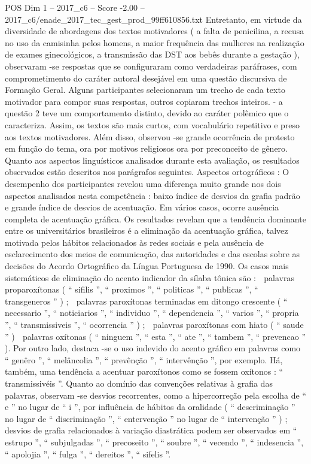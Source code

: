 \begin{textsample}{POS Dim 1 – 2017\_c6 – Score -2.00 – 2017\_c6/enade\_2017\_tec\_gest\_prod\_99ff610856.txt}
Entretanto, em virtude da diversidade de abordagens dos textos motivadores ( a falta de penicilina, a recusa no uso da camisinha pelos homens, a maior frequência das mulheres na realização de exames ginecológicos, a transmissão das DST aos bebês durante a gestação ), observaram -se respostas que se configuraram como verdadeiras paráfrases, com comprometimento do caráter autoral desejável em uma questão discursiva de Formação Geral.
Alguns participantes selecionaram um trecho de cada texto motivador para compor suas respostas, outros copiaram trechos inteiros. - a questão 2 teve um comportamento distinto, devido ao caráter polêmico que o caracteriza.
Assim, os textos são mais curtos, com vocabulário repetitivo e preso aos textos motivadores.
Além disso, observou -se grande ocorrência de protesto em função do tema, ora por motivos religiosos ora por preconceito de gênero.
Quanto aos aspectos linguísticos analisados durante esta avaliação, os resultados observados estão descritos nos parágrafos seguintes.
Aspectos ortográficos : O desempenho dos participantes revelou uma diferença muito grande nos dois aspectos analisados nesta competência : baixo índice de desvios da grafia padrão e grande índice de desvios de acentuação.
Em vários casos, ocorre ausência completa de acentuação gráfica.
Os resultados revelam que a tendência dominante entre os universitários brasileiros é a eliminação da acentuação gráfica, talvez motivada pelos hábitos relacionados às redes sociais e pela ausência de esclarecimento dos meios de comunicação, das autoridades e das escolas sobre as decisões do Acordo Ortográfico da Língua Portuguesa de 1990.
Os casos mais sistemáticos de eliminação do acento indicador da sílaba tônica são :  palavras proparoxítonas ( “ sifilis ”, “ proximos ”, “ politicas ”, “ publicas ”, “ transgeneros ” ) ;  palavras paroxítonas terminadas em ditongo crescente ( “ necessario ”, “ noticiarios ”, “ individuo ”, “ dependencia ”, “ varios ”, “ propria ”, “ transmissiveis ”, “ ocorrencia ” ) ;  palavras paroxítonas com hiato ( “ saude ” )  palavras oxítonas ( “ ninguem ”, “ esta ”, “ ate ”, “ tambem ”, “ prevencao ” ).
Por outro lado, destaca -se o uso indevido do acento gráfico em palavras como “ genêro ”, “ melâncolia ”, “ prevênção ”, “ intervênção ”, por exemplo.
Há, também, uma tendência a acentuar paroxítonos como se fossem oxítonos : “ transmissivéis ”.
Quanto ao domínio das convenções relativas à grafia das palavras, observam -se desvios recorrentes, como a hipercorreção pela escolha de “ e ” no lugar de “ i ”, por influência de hábitos da oralidade ( “ descriminação ” no lugar de “ discriminação ”, “ entervenção ” no lugar de “ intervenção ” ) ; desvios de grafia relacionados à variação diastrática podem ser observados em “ estrupo ”, “ subjulgadas ”, “ precoseito ”, “ soubre ”, “ vecendo ”, “ indesencia ”, “ apolojia ”, “ fulga ”, “ dereitos ”, “ sifelis ”.

\end{textsample}
